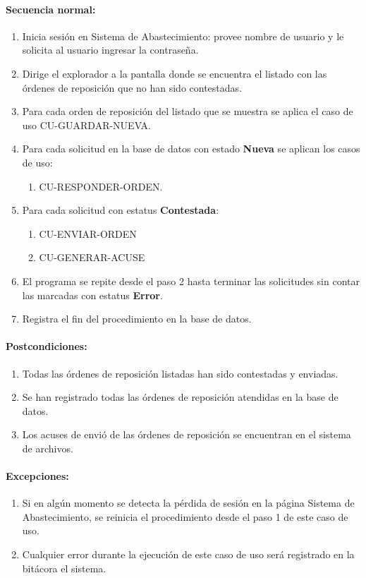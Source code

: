 \paragraph{Secuencia normal:}
\begin{enumerate}
  \item Inicia sesión en Sistema de Abastecimiento: provee nombre de usuario y le solicita al usuario ingresar la contraseña.
  \item Dirige el explorador a la pantalla donde se encuentra el listado con las órdenes de reposición que no han sido contestadas.
  \item Para cada orden de reposición del listado que se muestra se aplica el caso de uso CU-GUARDAR-NUEVA.
  \item Para cada solicitud en la base de datos con estado \textbf{Nueva} se aplican los casos de uso:
  \begin{enumerate}
    \item CU-RESPONDER-ORDEN.
  \end{enumerate}
  \item Para cada solicitud con estatus \textbf{Contestada}:
  \begin{enumerate}
    \item CU-ENVIAR-ORDEN
    \item CU-GENERAR-ACUSE
  \end{enumerate}
  \item El programa se repite desde el paso 2 hasta terminar las solicitudes sin contar las marcadas con estatus \textbf{Error}.
  \item Registra el fin del procedimiento en la base de datos.
\end{enumerate}
\paragraph{Postcondiciones:}
\begin{enumerate}
  \item Todas las órdenes de reposición listadas han sido contestadas y enviadas.
  \item Se han registrado todas las órdenes de reposición atendidas en la base de datos.
  \item Los acuses de envió de las órdenes de reposición se encuentran en el sistema de archivos.
\end{enumerate}
\paragraph{Excepciones:}
\begin{enumerate}
  \item Si en algún momento se detecta la pérdida de sesión en la página Sistema de Abastecimiento, se reinicia el procedimiento desde el paso 1 de este caso de uso.
  \item Cualquier error durante la ejecución de este caso de uso será registrado en la bitácora el sistema.
\end{enumerate}


